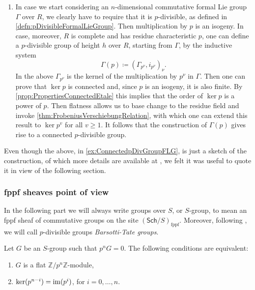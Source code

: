 \begin{ex}
\begin{enumerate}
\item In case we start considering an $n$-dimensional commutative\label{ex:ConnectedpDivGroupFLG}
	formal Lie group $\Gamma$ over $R$, we clearly have to require that it is $p$-divisible,
	as defined in \cref{defn:pDivisibleFormalLieGroup}.
	Then multiplication by $p$ is an isogeny.
	In case, moreover, $R$ is complete and has residue characteristic $p$,
	one can define a $p$-divisible group of height $h$
	over $R$, starting from $\Gamma$, by the inductive system
	\begin{equation*}
		\Gamma(p) \coloneqq \left(\Gamma_{p^\nu}, i_{p^\nu}\right)_\nu
	.\end{equation*} 
	In the above $\Gamma_{p^\nu}$ is the kernel of
	the multiplication by $p^\nu$ in $\Gamma$.
	Then one can prove that $\ker p$ is connected and,
	since $p$ is an isogeny, it is also finite.
	By \cref{prop:PropertiesConnectedEtale} this implies that
	the order of $\ker p$ is a power of $p$.
	Then flatness allows us to base change to the residue field and invoke
	\cref{thm:FrobeniusVerschiebungRelation}, with which one can extend 
	this result to $\ker p^v$ for all $v \geq 1$.
	It follows that the construction of $\Gamma(p)$
	gives rise to a connected $p$-divisible group.
\end{enumerate}
\end{ex}


\begin{rem}[]
	Even though the above, in \cref{ex:ConnectedpDivGroupFLG},
	is just a sketch of the construction, of which more details
	are available at \cite[\S6]{Shatz},
	we felt it was useful to quote it in view of the following section.
\end{rem}



\subsubsection{fppf sheaves point of view}
In the following part we will always write groups over $S$, or $S$-group, to mean
an fppf sheaf of commutative groups on the site $(\mathsf{Sch}/S)_{\mathrm{fppf}}$.
Moreover, following \cite{Messing}, we will call $p$-divisible groups
{\em Barsotti-Tate groups}.


\begin{lem}\label{lem:equivCondTruncatedBTGroup}
	Let $G$ be an $S$-group such that $p^nG = 0$.
	The following conditions are equivalent:
\begin{enumerate}
	\item $G$ is a flat $\mathbb{Z}/p^n\mathbb{Z}$-module,

	\item $\ker(p^{n-i}) = \operatorname{im} (p^i)$, for $i=0, \ldots, n$.
\end{enumerate}
\end{lem} 


